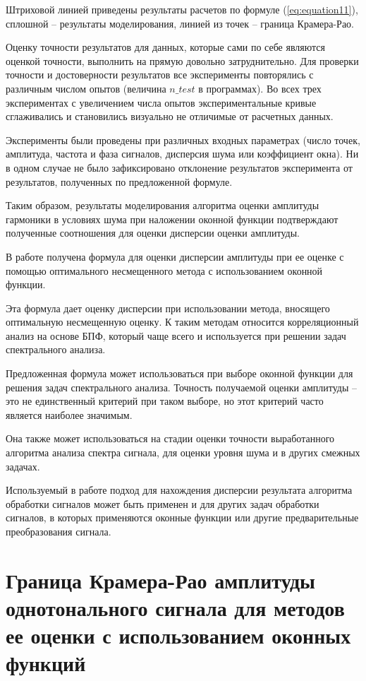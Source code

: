 Штриховой линией приведены результаты расчетов по формуле (\ref{eq:equation11}), сплошной -- результаты моделирования, линией из точек -- граница Крамера-Рао.

Оценку точности результатов для данных, которые сами по себе являются оценкой точности, выполнить на прямую довольно затруднительно. Для проверки точности и достоверности результатов все эксперименты повторялись с различным числом опытов (величина $n\_test$ в программах). Во всех трех экспериментах с увеличением числа опытов экспериментальные кривые сглаживались и становились визуально не отличимые от расчетных данных.

Эксперименты были проведены при различных входных параметрах (число точек, амплитуда, частота и фаза сигналов, дисперсия шума или коэффициент окна). Ни в одном случае не было зафиксировано отклонение результатов эксперимента от результатов, полученных по предложенной формуле.

Таким образом, результаты моделирования алгоритма оценки амплитуды гармоники в условиях шума при наложении оконной функции подтверждают полученные соотношения для оценки дисперсии оценки амплитуды.

В работе получена формула для оценки дисперсии амплитуды при ее оценке с помощью оптимального несмещенного метода с использованием оконной функции.

Эта формула дает оценку дисперсии при использовании метода, вносящего оптимальную несмещенную оценку. К таким методам относится корреляционный анализ на основе БПФ, который чаще всего и используется при решении задач спектрального анализа.

Предложенная формула может использоваться при выборе оконной функции для решения задач спектрального анализа. Точность получаемой оценки амплитуды – это не единственный критерий при таком выборе, но этот критерий часто является наиболее значимым.

Она также может использоваться на стадии оценки точности выработанного алгоритма анализа спектра сигнала, для оценки уровня шума и в других смежных задачах.

Используемый в работе подход для нахождения дисперсии результата алгоритма обработки сигналов может быть применен и для других задач обработки сигналов, в которых применяются оконные функции или другие предварительные преобразования сигнала.

\section{Граница Крамера-Рао амплитуды однотонального сигнала для методов ее оценки с использованием оконных функций} \label{sec:ch2/sec6} %

